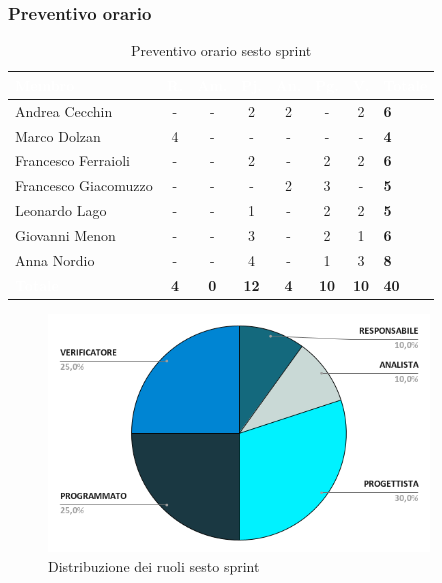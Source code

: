 \subsubsection{Preventivo orario}
{
\setlength{\tabcolsep}{10pt}
\renewcommand{\arraystretch}{1.5}
\begin{table}[h!]
    \centering
    \begin{tabularx}{\textwidth}{| l | c | c | c | c | c | c | X |}
        \hline
        \rowcolor{headerrow} \textbf{\textcolor{white}{Membro}} & \textbf{\textcolor{white}{R.}} & \textbf{\textcolor{white}{Am.}} & \textbf{\textcolor{white}{Pj.}} & \textbf{\textcolor{white}{An.}} & \textbf{\textcolor{white}{Pg.}} & \textbf{\textcolor{white}{V.}} & \textbf{\textcolor{white}{Totale}} \\
        \hline
        Andrea Cecchin & - & - & 2 & 2 & - & 2 & \textbf{6} \\
        \hline
        Marco Dolzan & 4 & - & - & - & - & - & \textbf{4} \\
        \hline
        Francesco Ferraioli & - & - & 2 & - & 2 & 2 & \textbf{6} \\
        \hline  
        Francesco Giacomuzzo & - & - & - & 2 & 3 & - & \textbf{5} \\
        \hline
        Leonardo Lago & - & - & 1 & - & 2 & 2 & \textbf{5} \\
        \hline
        Giovanni Menon & - & - & 3 & - & 2 & 1 & \textbf{6} \\
        \hline
        Anna Nordio & - & - & 4 & - & 1 & 3 & \textbf{8} \\
        \hline
    \cellcolor{headerrow} \textbf{\textcolor{white}{Totale}} & \textbf{4} & \textbf{0} & \textbf{12} & \textbf{4} & \textbf{10} & \textbf{10} & \textbf{40} \\
        \hline
    \end{tabularx} 
    \caption{Preventivo orario sesto sprint}
    \label{tab:preventivoorariosestosprint}
\end{table}
}

\begin{figure}[h!]
    \centering
    \includegraphics[width=0.9\textwidth]{prev6ruoli.png}
    \caption{Distribuzione dei ruoli sesto sprint}
    \label{fig:preventivoorariosestosprint}
\end{figure}

